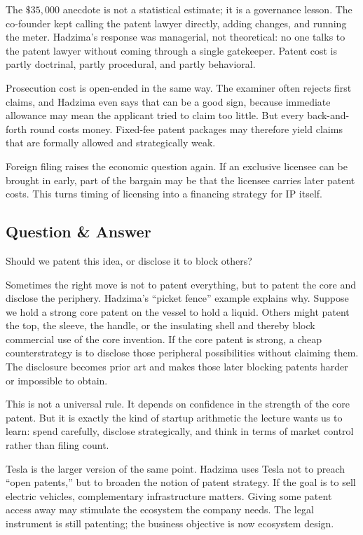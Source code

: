 The \(\$35{,}000\) anecdote is not a statistical estimate; it is a governance lesson. The co-founder kept calling the patent lawyer directly, adding changes, and running the meter. Hadzima's response was managerial, not theoretical: no one talks to the patent lawyer without coming through a single gatekeeper. Patent cost is partly doctrinal, partly procedural, and partly behavioral.

Prosecution cost is open-ended in the same way. The examiner often rejects first claims, and Hadzima even says that can be a good sign, because immediate allowance may mean the applicant tried to claim too little. But every back-and-forth round costs money. Fixed-fee patent packages may therefore yield claims that are formally allowed and strategically weak.

Foreign filing raises the economic question again. If an exclusive licensee can be brought in early, part of the bargain may be that the licensee carries later patent costs. This turns timing of licensing into a financing strategy for IP itself.

\subsection{Question \& Answer}

Should we patent this idea, or disclose it to block others?

Sometimes the right move is not to patent everything, but to patent the core and disclose the periphery. Hadzima's ``picket fence'' example explains why. Suppose we hold a strong core patent on the vessel to hold a liquid. Others might patent the top, the sleeve, the handle, or the insulating shell and thereby block commercial use of the core invention. If the core patent is strong, a cheap counterstrategy is to disclose those peripheral possibilities without claiming them. The disclosure becomes prior art and makes those later blocking patents harder or impossible to obtain.

This is not a universal rule. It depends on confidence in the strength of the core patent. But it is exactly the kind of startup arithmetic the lecture wants us to learn: spend carefully, disclose strategically, and think in terms of market control rather than filing count.

Tesla is the larger version of the same point. Hadzima uses Tesla not to preach ``open patents,'' but to broaden the notion of patent strategy. If the goal is to sell electric vehicles, complementary infrastructure matters. Giving some patent access away may stimulate the ecosystem the company needs. The legal instrument is still patenting; the business objective is now ecosystem design.

